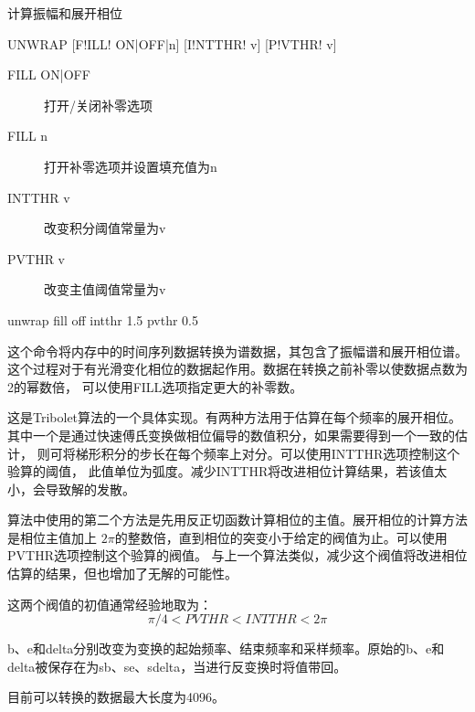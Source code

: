 \label{cmd:unwrap}

计算振幅和展开相位

\begin{SACSTX}
UNWRAP [F!ILL! ON|OFF|n] [I!NTTHR! v] [P!VTHR! v]
\end{SACSTX}

\begin{description}
\item [FILL ON|OFF] 打开/关闭补零选项
\item [FILL n] 打开补零选项并设置填充值为n
\item [INTTHR v] 改变积分阈值常量为v
\item [PVTHR v] 改变主值阈值常量为v
\end{description}

\begin{SACDFT}
unwrap fill off intthr 1.5 pvthr 0.5
\end{SACDFT}

这个命令将内存中的时间序列数据转换为谱数据，其包含了振幅谱和展开相位谱。
这个过程对于有光滑变化相位的数据起作用。数据在转换之前补零以使数据点数为2的幂数倍，
可以使用FILL选项指定更大的补零数。

这是Tribolet算法的一个具体实现。有两种方法用于估算在每个频率的展开相位。
其中一个是通过快速傅氏变换做相位偏导的数值积分，如果需要得到一个一致的估计，
则可将梯形积分的步长在每个频率上对分。可以使用INTTHR选项控制这个验算的阈值，
此值单位为弧度。减少INTTHR将改进相位计算结果，若该值太小，会导致解的发散。

算法中使用的第二个方法是先用反正切函数计算相位的主值。展开相位的计算方法是相位主值加上
$2\pi$的整数倍，直到相位的突变小于给定的阀值为止。可以使用PVTHR选项控制这个验算的阀值。
与上一个算法类似，减少这个阀值将改进相位估算的结果，但也增加了无解的可能性。

这两个阀值的初值通常经验地取为：
\[ \pi/4 < PVTHR < INTTHR < 2\pi \]

b、e和delta分别改变为变换的起始频率、结束频率和采样频率。原始的b、e和delta被保存在为sb、se、sdelta，当进行反变换时将值带回。

目前可以转换的数据最大长度为4096。

